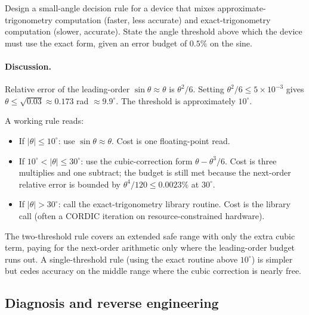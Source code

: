 \begin{exercise}
Design a small-angle decision rule for a device that mixes
approximate-trigonometry computation (faster, less accurate) and
exact-trigonometry computation (slower, accurate). State the angle
threshold above which the device must use the exact form, given an
error budget of $0.5\%$ on the sine.

\paragraph{Discussion.} Relative error of the leading-order $\sin
\theta \approx \theta$ is $\theta^{2}/6$. Setting $\theta^{2}/6 \leq
5 \times 10^{-3}$ gives $\theta \leq \sqrt{0.03} \approx 0.173$ rad
$\approx 9.9^{\circ}$. The threshold is approximately $10^{\circ}$.

A working rule reads:

\begin{itemize}[leftmargin=*]
  \item If $|\theta| \leq 10^{\circ}$: use $\sin\theta \approx
    \theta$. Cost is one floating-point read.
  \item If $10^{\circ} < |\theta| \leq 30^{\circ}$: use the
    cubic-correction form $\theta - \theta^{3}/6$. Cost is three
    multiplies and one subtract; the budget is still met because
    the next-order relative error is bounded by $\theta^{4}/120
    \leq 0.0023\%$ at $30^{\circ}$.
  \item If $|\theta| > 30^{\circ}$: call the exact-trigonometry
    library routine. Cost is the library call (often a CORDIC
    iteration on resource-constrained hardware).
\end{itemize}

The two-threshold rule covers an extended safe range with only the
extra cubic term, paying for the next-order arithmetic only where
the leading-order budget runs out. A single-threshold rule (using
the exact routine above $10^{\circ}$) is simpler but cedes accuracy
on the middle range where the cubic correction is nearly free.
\end{exercise}

\subsection*{Diagnosis and reverse engineering}

